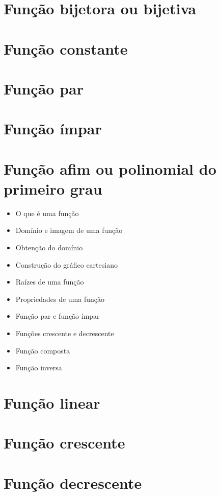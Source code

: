 \documentclass[11pt,fleqn]{book}
\begin{document}
\chapter{Função bijetora ou bijetiva}

\chapter{Função constante}

\chapter{Função par}

\chapter{Função ímpar}

\chapter{Função afim ou polinomial do primeiro grau}
    \begin{itemize}
    	\item O que é uma função
    	\item Domínio e imagem de uma função
    	\item Obtenção do domínio
    	\item Construção do gráfico cartesiano
    	\item Raízes de uma função
    	\item Propriedades de uma função
    	\item Função par e função ímpar
    	\item Funções crescente e decrescente
    	\item Função composta
    	\item Função inversa
    \end{itemize}

\chapter{Função linear}

\chapter{Função crescente}

\chapter{Função decrescente}
\end{document}
